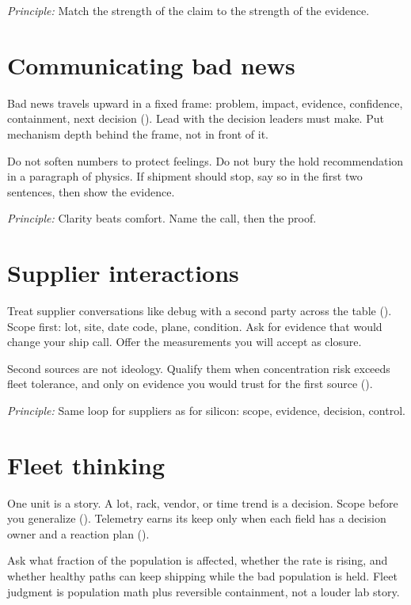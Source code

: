 \textit{Principle:} Match the strength of the claim to the strength of the
evidence.

\section{Communicating bad news}
\label{sec:staff-bad-news}

Bad news travels upward in a fixed frame: problem, impact, evidence,
confidence, containment, next decision (). Lead
with the decision leaders must make. Put mechanism depth behind the frame, not
in front of it.

Do not soften numbers to protect feelings. Do not bury the hold
recommendation in a paragraph of physics. If shipment should stop, say so in
the first two sentences, then show the evidence.

\textit{Principle:} Clarity beats comfort. Name the call, then the proof.

\section{Supplier interactions}
\label{sec:staff-suppliers}

Treat supplier conversations like debug with a second party across the table
(). Scope
first: lot, site, date code, plane, condition. Ask for evidence that would
change your ship call. Offer the measurements you will accept as closure.

Second sources are not ideology. Qualify them when concentration risk exceeds
fleet tolerance, and only on evidence you would trust for the first source
().

\textit{Principle:} Same loop for suppliers as for silicon: scope, evidence,
decision, control.

\section{Fleet thinking}
\label{sec:staff-fleet}

One unit is a story. A lot, rack, vendor, or time trend is a decision. Scope
before you generalize (). Telemetry earns its
keep only when each field has a decision owner and a reaction plan
().

Ask what fraction of the population is affected, whether the rate is rising,
and whether healthy paths can keep shipping while the bad population is held.
Fleet judgment is population math plus reversible containment, not a louder
lab story.

